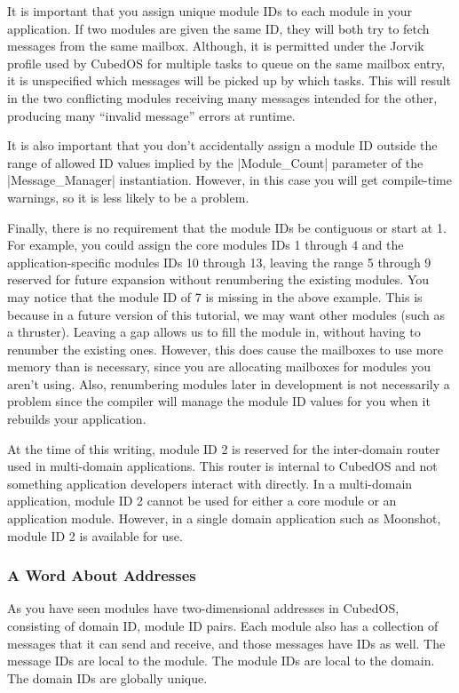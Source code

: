 It is important that you assign unique module IDs to each module in your application. If two
modules are given the same ID, they will both try to fetch messages from the same mailbox.
Although, it is permitted under the Jorvik profile used by CubedOS for multiple tasks to queue
on the same mailbox entry, it is unspecified which messages will be picked up by which tasks.
This will result in the two conflicting modules receiving many messages intended for the other,
producing many ``invalid message'' errors at runtime.

It is also important that you don't accidentally assign a module ID outside the range of allowed
ID values implied by the |Module_Count| parameter of the |Message_Manager| instantiation.
However, in this case you will get compile-time warnings, so it is less likely to be a problem.

Finally, there is no requirement that the module IDs be contiguous or start at 1. For example,
you could assign the core modules IDs 1 through 4 and the application-specific modules IDs 10
through 13, leaving the range 5 through 9 reserved for future expansion without renumbering the
existing modules. You may notice that the module ID of 7 is missing in the above example. This
is because in a future version of this tutorial, we may want other modules (such as a thruster).
Leaving a gap allows us to fill the module in, without having to renumber the existing ones.
However, this does cause the mailboxes to use more memory than is necessary, since you
are allocating mailboxes for modules you aren't using. Also, renumbering modules later in
development is not necessarily a problem since the compiler will manage the module ID values for
you when it rebuilds your application.

At the time of this writing, module ID 2 is reserved for the inter-domain router used in
multi-domain applications. This router is internal to CubedOS and not something application
developers interact with directly. In a multi-domain application, module ID 2 cannot be used for
either a core module or an application module. However, in a single domain application such as
Moonshot, module ID 2 is available for use.

\subsubsection{A Word About Addresses}
\label{sec:manual-tutorial-addresses}

As you have seen modules have two-dimensional addresses in CubedOS, consisting of domain ID,
module ID pairs. Each module also has a collection of messages that it can send and receive, and
those messages have IDs as well. The message IDs are local to the module. The module IDs are
local to the domain. The domain IDs are globally unique.

